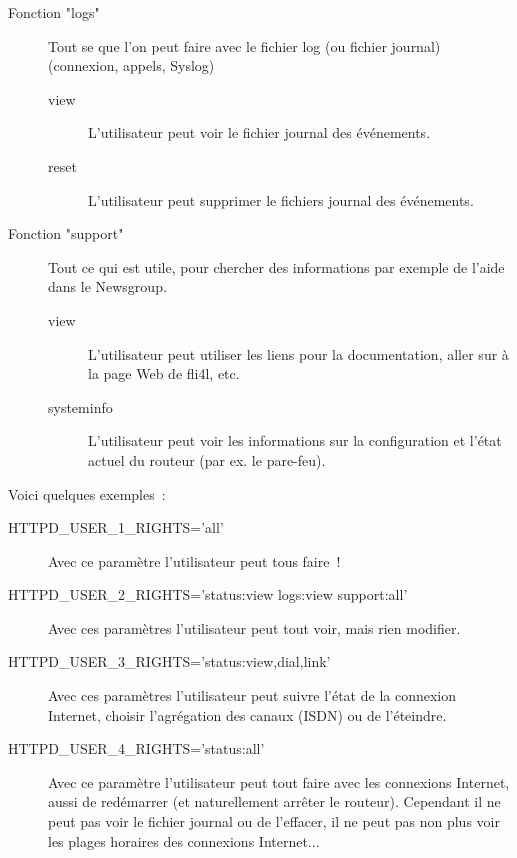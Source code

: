 \begin{description}
{\begin{description}
      \item[Fonction "logs"] Tout se que l'on peut faire avec le fichier log (ou
        fichier journal) (connexion, appels, Syslog)
        \begin{description}
        \item[view] L'utilisateur peut voir le fichier journal des événements.
        \item[reset] L'utilisateur peut supprimer le fichiers journal des événements.
        \end{description}

      \item[Fonction "support"] Tout ce qui est utile, pour chercher des informations
        par exemple de l'aide dans le Newsgroup.
        \begin{description}
        \item[view] L'utilisateur peut utiliser les liens pour la documentation, aller
          sur à la page Web de fli4l, etc.
        \item[systeminfo] L'utilisateur peut voir les informations sur la configuration
          et l'état actuel du routeur (par ex. le pare-feu).
        \end{description}
      \end{description}

    Voici quelques exemples~:

      \begin{description}
      \item[HTTPD\_USER\_1\_RIGHTS='all']
        Avec ce paramètre l'utilisateur peut tous faire~!

      \item[HTTPD\_USER\_2\_RIGHTS='status:view logs:view support:all']
        Avec ces paramètres l'utilisateur peut tout voir, mais rien modifier.

      \item[HTTPD\_USER\_3\_RIGHTS='status:view,dial,link']
        Avec ces paramètres l'utilisateur peut suivre l'état de la connexion
        Internet, choisir l'agrégation des canaux (ISDN) ou de l'éteindre.

      \item[HTTPD\_USER\_4\_RIGHTS='status:all']
        Avec ce paramètre l'utilisateur peut tout faire avec les connexions
        Internet, aussi de redémarrer (et naturellement arrêter le routeur).
        Cependant il ne peut pas voir le fichier journal ou de l'effacer,
        il ne peut pas non plus voir les plages horaires des connexions Internet...
      \end{description}
    }

\end{description}

